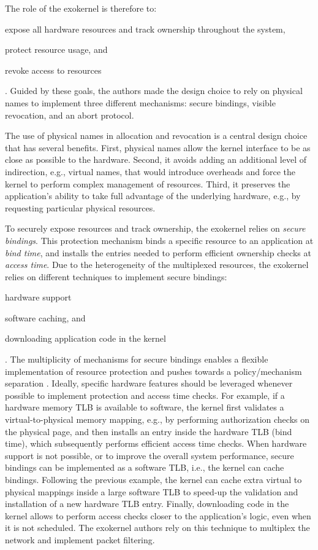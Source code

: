 The role of the exokernel is therefore to:
\begin{enumerate*}
	\item \label{expose} expose all hardware resources and track ownership throughout the system,
	\item \label{protect} protect resource usage, and
	\item \label{revoke} revoke access to resources
\end{enumerate*}.
Guided by these goals, the authors made the design choice to rely on physical names to implement three different mechanisms: secure bindings, visible revocation, and an abort protocol.

The use of physical names in allocation and revocation is a central design choice that has several benefits.
First, physical names allow the kernel interface to be as close as possible to the hardware.
Second, it avoids adding an additional level of indirection, e.g., virtual names, that would introduce overheads and force the kernel to perform complex management of resources.
Third, it preserves the application's ability to take full advantage of the underlying hardware, e.g., by requesting particular physical resources.

To securely expose resources and track ownership, the exokernel relies on \emph{secure bindings}.
This protection mechanism binds a specific resource to an application at \emph{bind time}, and installs the entries needed to perform efficient ownership checks at \emph{access time}.
Due to the heterogeneity of the multiplexed resources, the exokernel relies on different techniques to implement secure bindings:
\begin{enumerate*}
	\item hardware support
	\item software caching, and
	\item downloading application code in the kernel
\end{enumerate*}.
The multiplicity of mechanisms for secure bindings enables a flexible implementation of resource protection and pushes towards a policy/mechanism separation \cite{DBLP:journals/cacm/LampsonS76}.
Ideally, specific hardware features should be leveraged whenever possible to implement protection and access time checks.
For example, if a hardware memory TLB is available to software, the kernel first validates a virtual-to-physical memory mapping, e.g., by performing authorization checks on the physical page, and then installs an entry inside the hardware TLB (bind time), which subsequently performs efficient access time checks.
When hardware support is not possible, or to improve the overall system performance, secure bindings can be implemented as a software TLB, i.e., the kernel can cache bindings.
Following the previous example, the kernel can cache extra virtual to physical mappings inside a large software TLB to speed-up the validation and installation of a new hardware TLB entry.
Finally, downloading code in the kernel allows to perform access checks closer to the application's logic, even when it is not scheduled.
The exokernel authors rely on this technique to multiplex the network and implement packet filtering.

